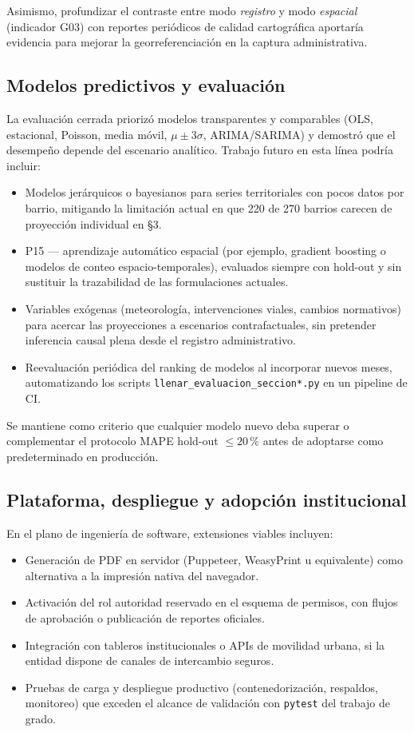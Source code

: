 Asimismo, profundizar el contraste entre modo \textit{registro} y modo \textit{espacial} (indicador G03) con reportes periódicos de calidad cartográfica aportaría evidencia para mejorar la georreferenciación en la captura administrativa.

\subsection{Modelos predictivos y evaluación}

La evaluación cerrada priorizó modelos transparentes y comparables (OLS, estacional, Poisson, media móvil, $\mu \pm 3\sigma$, ARIMA/SARIMA) y demostró que el desempeño depende del escenario analítico. Trabajo futuro en esta línea podría incluir:

\begin{itemize}
	\item Modelos jerárquicos o bayesianos para series territoriales con pocos datos por barrio, mitigando la limitación actual en que 220 de 270 barrios carecen de proyección individual en §3.
	\item P15 — aprendizaje automático espacial (por ejemplo, gradient boosting o modelos de conteo espacio-temporales), evaluados siempre con hold-out y sin sustituir la trazabilidad de las formulaciones actuales.
	\item Variables exógenas (meteorología, intervenciones viales, cambios normativos) para acercar las proyecciones a escenarios contrafactuales, sin pretender inferencia causal plena desde el registro administrativo.
	\item Reevaluación periódica del ranking de modelos al incorporar nuevos meses, automatizando los scripts \texttt{llenar\_evaluacion\_seccion*.py} en un pipeline de CI.
\end{itemize}

Se mantiene como criterio que cualquier modelo nuevo deba superar o complementar el protocolo MAPE hold-out $\leq 20\,\%$ antes de adoptarse como predeterminado en producción.

\subsection{Plataforma, despliegue y adopción institucional}

En el plano de ingeniería de software, extensiones viables incluyen:

\begin{itemize}
	\item Generación de PDF en servidor (Puppeteer, WeasyPrint u equivalente) como alternativa a la impresión nativa del navegador.
	\item Activación del rol autoridad reservado en el esquema de permisos, con flujos de aprobación o publicación de reportes oficiales.
	\item Integración con tableros institucionales o APIs de movilidad urbana, si la entidad dispone de canales de intercambio seguros.
	\item Pruebas de carga y despliegue productivo (contenedorización, respaldos, monitoreo) que exceden el alcance de validación con \texttt{pytest} del trabajo de grado.
\end{itemize}

